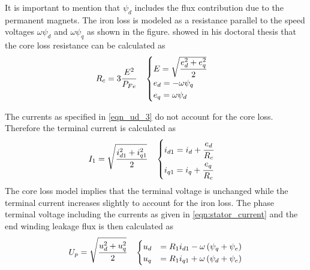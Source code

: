 It is important to mention that $\psi_d$ includes the flux contribution due to the permanent magnets. The iron loss is modeled as a resistance parallel to the speed voltages $\omega \psi_d$ and $\omega \psi_q$ as shown in the figure. \cite{Kamper1996} showed in his doctoral thesis that the core loss resistance can be calculated as
\begin{equation}
  \label{eqn:Rc}
  R_c = 3\cfrac{E^{2}}{P_{Fe}}
  \quad
  \begin{cases}
    E = \sqrt{\cfrac{e_{d}^{2}+e_{q}^{2}}{2}}\\
    e_d = -\omega \psi_q \\
    e_q = \omega \psi_d 
  \end{cases}
\end{equation}

The currents as specified in \eqref{eqn_ud_3} do not account for the core loss. Therefore the terminal current is calculated as
\begin{equation}
\label{eqn:stator_current}
  I_1 = \sqrt{\cfrac{i_{d1}^{2}+i_{q1}^{2}}{2}}
  \quad
  \begin{cases}
    i_{d1} = i_d+\cfrac{e_d}{R_c}\\
    i_{q1} = i_q+\cfrac{e_q}{R_c}
  \end{cases}
\end{equation}
The core loss model implies that the terminal voltage is unchanged while the terminal current increases slightly to account for the iron loss. The phase terminal voltage including the currents as given in \eqref{eqn:stator_current} and the end winding leakage flux is then calculated as
\begin{equation}
  \label{eqn:Up}
  U_p = \sqrt{\cfrac{u_{d}^{2}+u_{q}^{2}}{2}}
  \quad
  \begin{cases}  
	  u_d &= R_{1}i_{d1} - \omega \left(\psi_{q} + \psi_{e}\right) \\
	  u_q &= R_{1}i_{q1} + \omega \left(\psi_{d} + \psi_{e}\right)    
  \end{cases}
\end{equation}

